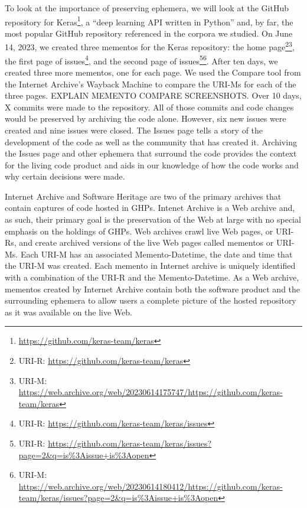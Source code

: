To look at the importance of preserving ephemera, we will look at the GitHub repository for Keras\footnote{\url{https://github.com/keras-team/keras}}, a ``deep learning API written in Python'' and, by far, the most popular GitHub repository referenced in the corpora we studied. On June 14, 2023, we created three mementos for the Keras repository: the home page\footnote{URI-R: \url{https://github.com/keras-team/keras}}\footnote{URI-M: \url{https://web.archive.org/web/20230614175747/https://github.com/keras-team/keras}}, the first page of issues\footnote{URI-R: \url{https://github.com/keras-team/keras/issues}}, and the second page of issues\footnote{URI-R: \url{https://github.com/keras-team/keras/issues?page=2\&q=is\%3Aissue+is\%3Aopen}}\footnote{URI-M: \url{https://web.archive.org/web/20230614180412/https://github.com/keras-team/keras/issues?page=2\&q=is\%3Aissue+is\%3Aopen}}. After ten days, we created three more mementos, one for each page. We used the Compare tool from the Internet Archive's Wayback Machine to compare the URI-Ms for each of the three pages. EXPLAIN MEMENTO COMPARE SCREENSHOTS. Over 10 days, X commits were made to the repository. All of those commits and code changes would be preserved by archiving the code alone. However, six new issues were created and nine issues were closed. The Issues page tells a story of the development of the code as well as the community that has created it. Archiving the Issues page and other ephemera that surround the code provides the context for the living code product and aids in our knowledge of how the code works and why certain decisions were made. 

Internet Archive and Software Heritage are two of the primary archives that contain captures of code hosted in GHPs. Intenet Archive is a Web archive and, as such, their primary goal is the preservation of the Web at large with no special emphasis on the holdings of GHPs. Web archives crawl live Web pages, or URI-Rs, and create archived versions of the live Web pages called mementos or URI-Ms. Each URI-M has an associated Memento-Datetime, the date and time that the URI-M was created. Each memento in Internet archive is uniquely identified with a combination of the URI-R and the Memento-Datetime. As a Web archive, mementos created by Internet Archive contain both the software product and the surrounding ephemera to allow users a complete picture of the hosted repository as it was available on the live Web.

